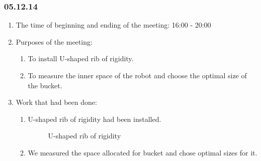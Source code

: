 \subsubsection{05.12.14}

\begin{enumerate}
	\item The time of beginning and ending of the meeting:
	16:00 - 20:00
	\item Purposes of the meeting:
	\begin{enumerate}
		\item To install U-shaped rib of rigidity.
		
		\item To measure the inner space of the robot and choose the optimal size of the bucket.
		
	\end{enumerate}
	\item Work that had been done:
	\begin{enumerate}
		\item U-shaped rib of rigidity had been installed.
		
		\begin{figure}[H]
			\begin{minipage}[h]{0.2\linewidth}
				\center  
			\end{minipage}
			\begin{minipage}[h]{0.6\linewidth}
				\caption{U-shaped rib of rigidity}
			\end{minipage}
		\end{figure}
		
		\item We measured the space allocated for bucket and chose optimal sizes for it.
		

\end{enumerate}
\end{enumerate}
